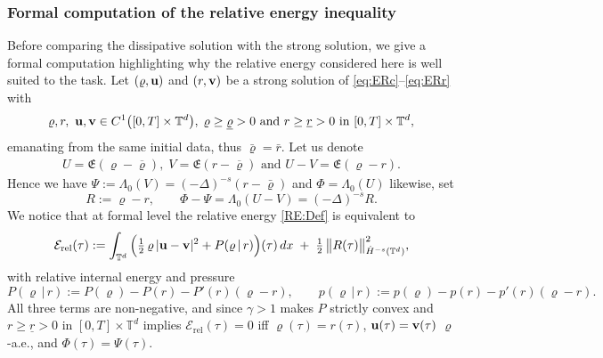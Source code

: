 \documentclass[12pt,a4paper,twoside]{article}
\newcommand{\Ov}[1]{\overline{#1}}
\newcommand{\vr}{\varrho}
\newcommand{\vu}{\vc{u}}
\newcommand{\vv}{\vc{v}}
\newcommand{\vc}[1]{{\bf #1}}
\newcommand{\Erel}{\mathcal{E}_{\mathrm{rel}}}
\numberwithin{equation}{section}%
\newcommand{\T}{\mathbb{T}}
\newcommand{\Lambdaz}{\Lambda_0}
\begin{document}
\subsubsection*{Formal computation of the relative energy inequality}
Before comparing the dissipative solution with the strong solution, we give a formal
computation highlighting why the relative energy considered here is well suited to the task.
Let $(\vr,\vu)$ and $(r,\vv)$ be a strong solution of \eqref{eq:ERc}--\eqref{eq:ERr} with 
	\begin{equation}
	\vr,r,\ \vu, \vv\in C^1\big([0,T]\times\mathbb T^d\big),\;
	\vr  \geq  \underline{\vr}>0 \text{ and } r \geq \underline{r}>0 \text{ in } [0,T]\times \T^d,
\end{equation}
 emanating from the same initial data, thus $\bar \vr=\bar r$. 
 Let us denote
 \begin{align}\label{UV-formal}
 	U=\mathfrak{E}(\vr-\Ov{\vr}),\; V=\mathfrak{E}( r-\Ov{\vr})  \text{ and } U- V=\mathfrak{E}( \vr-r) .
 \end{align}
  Hence we have $\Psi:=\Lambdaz(V)=(-\Delta)^{-s}(r-\bar\vr)$ and $\Phi=\Lambdaz(U)$ likewise, set
\[
R:=\vr-r ,\qquad \Phi-\Psi=\Lambdaz(U-V)=(-\Delta)^{-s}R .
\]
We notice that at formal level the relative energy \eqref{RE:Def} is equivalent to
\begin{equation}\label{RE}
\Erel(\tau):=\int_{\mathbb T^d}\Big(\tfrac12\,\vr\,|\vu-\vv|^2+P(\vr\,|\,r)\Big)(\tau)\,dx
	\;+\;\tfrac12\,\big\|R(\tau)\big\|_{\dot H^{-s}(\mathbb T^d)}^2 ,
\end{equation}
with relative internal energy and pressure
\[
P(\vr\,|\,r):=P(\vr)-P(r)-P'(r)(\vr-r),\qquad
p(\vr\,|\,r):=p(\vr)-p(r)-p'(r)(\vr-r).
\]
All three terms are non-negative, and since $\gamma>1$ makes $P$ strictly convex and $r \geq \underline{r}>0 \text{ in } [0,T]\times \T^d$ implies $\Erel(\tau)=0$ iff $\vr(\tau)=r(\tau)$, $\vu(\tau)=\vv(\tau)$ $\vr$-a.e., and $\Phi(\tau)=\Psi(\tau)$.
\end{document}
